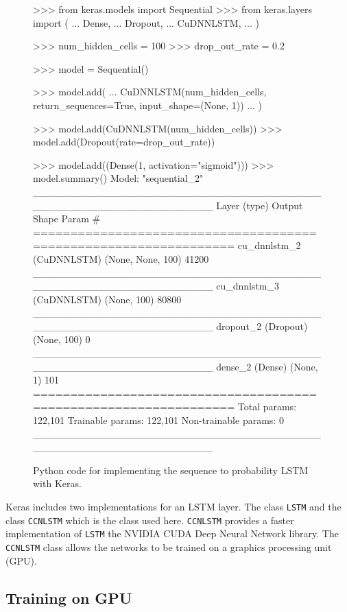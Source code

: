 \begin{figure}[!htbp]
\begin{usagepy}
    >>> from keras.models import Sequential
>>> from keras.layers import (
...     Dense,
...     Dropout,
...     CuDNNLSTM,
... )

>>> num_hidden_cells = 100
>>> drop_out_rate = 0.2

>>> model = Sequential()

>>> model.add(
...     CuDNNLSTM(num_hidden_cells, return_sequences=True, input_shape=(None, 1))
... )

>>> model.add(CuDNNLSTM(num_hidden_cells))
>>> model.add(Dropout(rate=drop_out_rate))

>>> model.add((Dense(1, activation="sigmoid")))
>>> model.summary()
Model: "sequential_2"
_________________________________________________________________
Layer (type)                 Output Shape              Param #   
=================================================================
cu_dnnlstm_2 (CuDNNLSTM)     (None, None, 100)         41200     
_________________________________________________________________
cu_dnnlstm_3 (CuDNNLSTM)     (None, 100)               80800     
_________________________________________________________________
dropout_2 (Dropout)          (None, 100)               0         
_________________________________________________________________
dense_2 (Dense)              (None, 1)                 101       
=================================================================
Total params: 122,101
Trainable params: 122,101
Non-trainable params: 0
_________________________________________________________________

\end{usagepy}
\caption{Python code for implementing the sequence to probability LSTM with Keras.}\label{fig:keras_sequence_to_probability}
\end{figure}

Keras includes two implementations for an LSTM layer. The class
\texttt{LSTM} and the class \texttt{CCNLSTM} which is
the class used here. \texttt{CCNLSTM} provides a faster
implementation of \texttt{LSTM} the NVIDIA CUDA Deep Neural Network
library. The \texttt{CCNLSTM} class allows the networks to be
trained on a graphics processing unit (GPU).

\subsection{Training on GPU}

